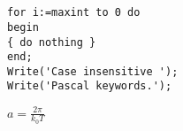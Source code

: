 \documentclass{article}
\begin{document}
\section{}
\lstset{language=C}          %

\begin{lstlisting}[frame=single]  % Start your code-block
for i:=maxint to 0 do
begin
{ do nothing }
end;
Write('Case insensitive ');
Write('Pascal keywords.');
\end{lstlisting}

$a=\frac{2\pi}{k_0T}$
\end{document}
